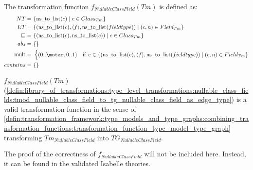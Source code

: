 \begin{defin}
\label{defin:library_of_transformations:type_level_transformations:nullable_class_fields:tmod_nullable_class_field_to_tg_nullable_class_field_as_edge_type}
The transformation function $f_{NullableClassField}(Tm)$ is defined as:
\begin{align*}
NT =\ &\{\mathrm{ns\_\!to\_\!list}(c) \mid c \in Class_{Tm}\}\\
ET =\ &\{(\mathrm{ns\_\!to\_\!list}(c), \langle f \rangle, \mathrm{ns\_\!to\_\!list}(fieldtype)) \mid (c, n) \in Field_{Tm} \} \\
\!\!\sqsubseteq\ =\ &\{( \mathrm{ns\_\!to\_\!list}(c), \mathrm{ns\_\!to\_\!list}(c) ) \mid c \in Class_{Tm} \} \\
abs =\ &\{\} \\
\mathrm{mult} =\ &\begin{cases}
    (0..\mstar, 0..1) &\mathrm{if}\ e \in \{(\mathrm{ns\_\!to\_\!list}(c), \langle f \rangle, \mathrm{ns\_\!to\_\!list}(fieldtype)) \mid (c, n) \in Field_{Tm} \}
\end{cases} \\
contains =\ &\{\}
\end{align*}
\end{defin}

\begin{thm}
\label{defin:library_of_transformations:type_level_transformations:nullable_class_fields:tmod_nullable_class_field_to_tg_nullable_class_field_as_edge_type_func}
$f_{NullableClassField}(Tm)$ (\cref{defin:library_of_transformations:type_level_transformations:nullable_class_fields:tmod_nullable_class_field_to_tg_nullable_class_field_as_edge_type}) is a valid transformation function in the sense of \cref{defin:transformation_framework:type_models_and_type_graphs:combining_transformation_functions:transformation_function_type_model_type_graph} transforming $Tm_{NullableClassField}$ into $TG_{NullableClassField}$.
\end{thm}

The proof of the correctness of $f_{NullableClassField}$ will not be included here. Instead, it can be found in the validated Isabelle theories.

